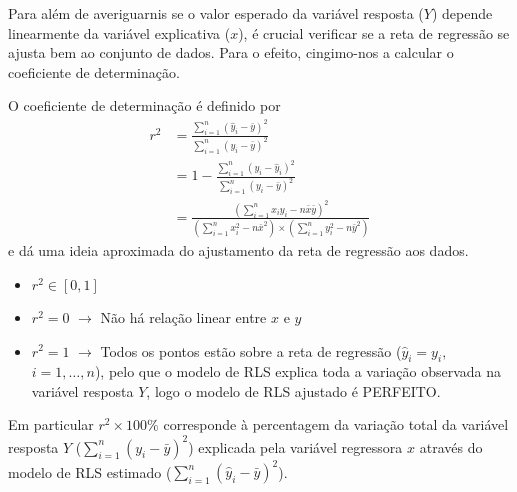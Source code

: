 Para além de averiguarnis se o valor esperado da variável resposta ($Y$) depende linearmente da variável explicativa ($x$), é crucial verificar se a reta de regressão se ajusta bem ao conjunto de dados. Para o efeito, cingimo-nos a calcular o coeficiente de determinação.

\begin{mdframed}
    O coeficiente de determinação é definido por
    $$
        \begin{aligned}
            r^2 &= \frac{\sum^{n}_{i=1} (\hat{y}_i - \bar{y})^2}{\sum^{n}_{i=1} (y_i - \bar{y})^2} \\
            &= 1 - \frac{\sum^{n}_{i=1} (y_i - \hat{y}_i)^2}{\sum^{n}_{i=1} (y_i - \bar{y})^2} \\
            &= \frac{(\sum^{n}_{i=1} x_i y_i - n \bar{x}\bar{y})^2}{(\sum^{n}_{i=1} x^2_i - n\bar{x}^2) \times (\sum^{n}_{i=1} y^2_i - n\bar{y}^2)}
        \end{aligned}
    $$
    e dá uma ideia aproximada do ajustamento da reta de regressão aos dados. 
    \begin{itemize}
        \item $r^2 \in [0,1]$
        \item $r^2 = 0$ $\rightarrow$ Não há relação linear entre $x$ e $y$
        \item $r^2 = 1$ $\rightarrow$ Todos os pontos estão sobre a reta de regressão ($\hat{y}_i = y_i,$ $i=1,\dots,n$), pelo que o modelo de RLS explica toda a variação observada na variável resposta $Y$, logo o modelo de RLS ajustado é PERFEITO.\footnotemark[7]
    \end{itemize}
    Em particular $r^2 \times 100\%$ corresponde à percentagem da variação total da variável resposta $Y$ ($\sum^{n}_{i=1} (y_i - \bar{y})^2$) explicada pela variável regressora $x$ através do modelo de RLS estimado ($\sum^{n}_{i=1} (\hat{y}_i - \bar{y})^2$).
\end{mdframed}


